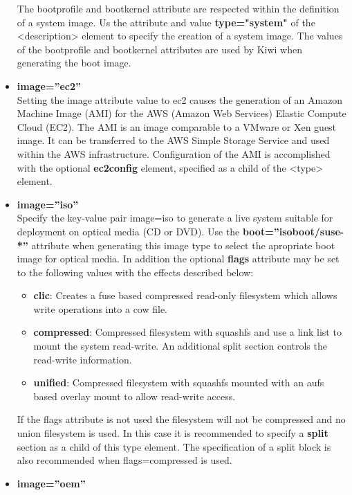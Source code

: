 \begin{itemize}
      The bootprofile and bootkernel attribute are respected within the 
      definition of a system image. Us the attribute and value 
      \textbf{type="system"} of the <description> element to specify the
      creation of a system image. The values of the bootprofile and 
      bootkernel attributes are used by Kiwi when generating the boot image.
\item \textbf{image=''ec2''}\\
      Setting the image attribute value to ec2 causes the generation of
      an Amazon Machine Image (AMI) for the AWS (Amazon Web Services) 
      Elastic Compute Cloud (EC2). The AMI is an image comparable to
      a VMware or Xen guest image. It can be transferred to the AWS 
      Simple Storage Service and used within the AWS infrastructure.
      Configuration of the AMI is accomplished with the optional
      \textbf{ec2config} element, specified as a child of the <type>
      element.
\item \textbf{image=''iso''}\\
      Specify the key-value pair image=iso to generate a live system suitable
      for deployment on optical media (CD or DVD). Use the 
      \textbf{boot=''isoboot/suse-*''} attribute when generating this image
      type to select the apropriate boot image for optical media. In 
      addition the optional \textbf{flags} attribute may be set to the
      following values with the effects described below:
      \begin{itemize}
      \item \textbf{clic}: Creates a fuse based compressed read-only
            filesystem which allows write operations into a cow file.
      \item \textbf{compressed}: Compressed filesystem with squashfs and
            use a link list to mount the system read-write. An additional
            split section controls the read-write information.
      \item \textbf{unified}: Compressed filesystem with squashfs mounted
            with an aufs based overlay mount to allow read-write access.
      \end{itemize}
      If the flags attribute is not used the filesystem will not be compressed
      and no union filesystem is used. In this case it is recommended to
      specify a \textbf{split} section as a child of this type element. The
      specification of a split block is also recommended when flags=compressed
      is used.
\item \textbf{image=''oem''}\\

\end{itemize}
